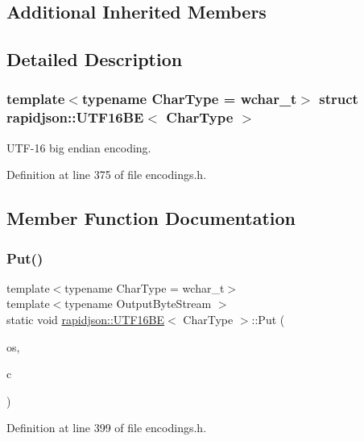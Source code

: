 \subsection*{Additional Inherited Members}


\subsection{Detailed Description}
\subsubsection*{template$<$typename Char\+Type = wchar\+\_\+t$>$\newline
struct rapidjson\+::\+U\+T\+F16\+B\+E$<$ Char\+Type $>$}

U\+T\+F-\/16 big endian encoding. 

Definition at line 375 of file encodings.\+h.



\subsection{Member Function Documentation}
\mbox{\label{structrapidjson_1_1_u_t_f16_b_e_a48f83982227d52c563f5c336deb73a44}} 
\subsubsection{\texorpdfstring{Put()}{Put()}}
{\footnotesize\ttfamily template$<$typename Char\+Type  = wchar\+\_\+t$>$ \\
template$<$typename Output\+Byte\+Stream $>$ \\
static void \mbox{\hyperlink{structrapidjson_1_1_u_t_f16_b_e}{rapidjson\+::\+U\+T\+F16\+BE}}$<$ Char\+Type $>$\+::Put (\begin{DoxyParamCaption}\item[{Output\+Byte\+Stream \&}]{os,  }\item[{Char\+Type}]{c }\end{DoxyParamCaption})\hspace{0.3cm}{\ttfamily [static]}}



Definition at line 399 of file encodings.\+h.


